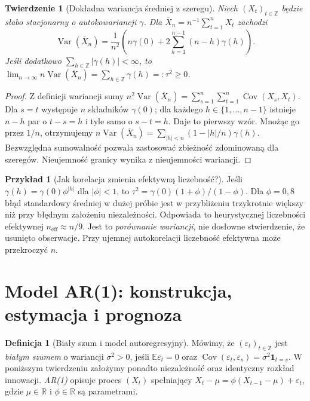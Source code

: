 \documentclass[11pt,a4paper,oneside]{report}
\numberwithin{equation}{chapter}
\theoremstyle{plain}
\newtheorem{twierdzenie}{Twierdzenie}[chapter]
\theoremstyle{definition}
\newtheorem{definicja}{Definicja}[chapter]
\newtheorem{przyklad}{Przykład}[chapter]
\theoremstyle{remark}
\newcommand{\R}{\mathbb R}
\newcommand{\E}{\mathbb E}
\newcommand{\Var}{\operatorname{Var}}
\newcommand{\Cov}{\operatorname{Cov}}
\newcommand{\ind}[1]{\mathbf 1_{#1}}
\begin{document}
\begin{twierdzenie}[Dokładna wariancja średniej z szeregu]
\label{thm:mean-time-variance}
Niech $(X_t)_{t\in\mathbb Z}$ będzie słabo stacjonarny
o autokowariancji $\gamma$. Dla
$\overline X_n=n^{-1}\sum_{t=1}^nX_t$ zachodzi
\[
 \Var(\overline X_n)=\frac1{n^2}
 \left(n\gamma(0)+2\sum_{h=1}^{n-1}(n-h)\gamma(h)\right).
\]
Jeśli dodatkowo $\sum_{h\in\mathbb Z}|\gamma(h)|<\infty$,
to
$\lim_{n\to\infty}n\Var(\overline X_n)
=\sum_{h\in\mathbb Z}\gamma(h)=:\tau^2\ge0$.
\end{twierdzenie}
\begin{proof}
Z definicji wariancji sumy
$n^2\Var(\overline X_n)=\sum_{s=1}^n\sum_{t=1}^n
\Cov(X_s,X_t)$. Dla $s=t$ występuje $n$ składników
$\gamma(0)$; dla każdego $h\in\{1,\ldots,n-1\}$
istnieje $n-h$ par o $t-s=h$ i tyle samo o $s-t=h$.
Daje to pierwszy wzór. Mnożąc go przez $1/n$,
otrzymujemy
$n\Var(\overline X_n)=\sum_{|h|<n}
(1-|h|/n)\gamma(h)$. Bezwzględna sumowalność
pozwala zastosować zbieżność zdominowaną dla szeregów.
Nieujemność granicy wynika z nieujemności wariancji.
\end{proof}

\begin{przyklad}[Jak korelacja zmienia efektywną liczebność?]
Jeśli $\gamma(h)=\gamma(0)\phi^{|h|}$ dla $|\phi|<1$,
to $\tau^2=\gamma(0)(1+\phi)/(1-\phi)$.
Dla $\phi=0{,}8$ błąd standardowy średniej w dużej próbie
jest w przybliżeniu trzykrotnie większy niż przy błędnym
założeniu niezależności. Odpowiada to heurystycznej
liczebności efektywnej $n_{\mathrm{eff}}\approx n/9$.
Jest to \emph{porównanie wariancji}, nie dosłowne
stwierdzenie, że usunięto obserwacje. Przy ujemnej
autokorelacji liczebność efektywna może przekroczyć $n$.
\end{przyklad}

\section{Model AR(1): konstrukcja, estymacja i prognoza}
\begin{definicja}[Biały szum i model autoregresyjny]
Mówimy, że $(\varepsilon_t)_{t\in\mathbb Z}$ jest
\emph{białym szumem} o wariancji $\sigma^2>0$, jeśli
$\E\varepsilon_t=0$ oraz
$\Cov(\varepsilon_t,\varepsilon_s)=\sigma^2\ind{t=s}$.
W poniższym twierdzeniu założymy ponadto niezależność
oraz identyczny rozkład innowacji. \emph{AR(1)} opisuje
proces $(X_t)$ spełniający
$X_t-\mu=\phi(X_{t-1}-\mu)+\varepsilon_t$,
gdzie $\mu\in\R$ i $\phi\in\R$ są parametrami.
\end{definicja}
\end{document}
